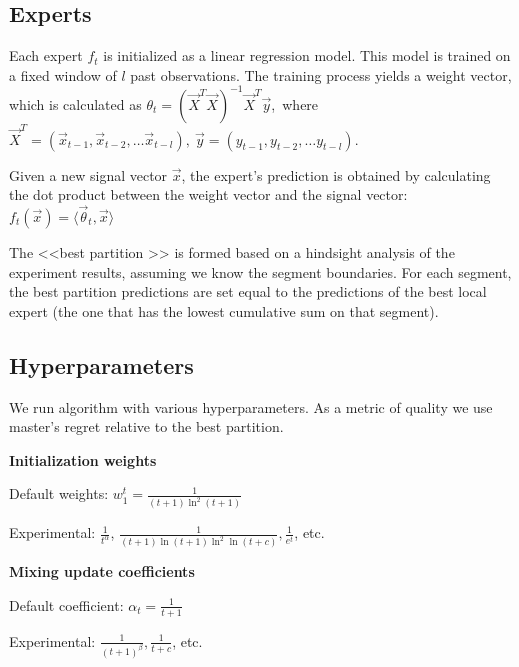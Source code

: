\documentclass[12pt, twoside]{article}
\begin{document}
\subsection{Experts}

Each expert $f_t$ is initialized as a linear regression model. 
This model is trained on a fixed window of $l$ past observations. 
The training process yields a weight vector, which is calculated as  
$\theta_t = (\vec X^T\vec X)^{-1}\vec X^T\vec y$,\ where $\vec X^T = (\vec x_{t-1}, \vec x_{t-2}, \dots \vec x_{t-l}),\ \vec y = (y_{t-1}, y_{t-2}, \dots y_{t-l})$. 

Given a new signal vector  $\vec x$, the expert's prediction is obtained by calculating the dot product between the weight vector and the signal vector: $f_t(\vec x) = \langle \vec \theta_t, \vec x \rangle$ 

The <<best partition >> is formed based on a hindsight analysis of the experiment results, assuming we know the segment boundaries. For each segment, the best partition predictions are set equal to the predictions of the best local expert (the one that has the lowest cumulative sum on that segment).
\newpage

\subsection{Hyperparameters}


We run algorithm with various hyperparameters. As a metric of quality we use master's regret relative to the best partition.

\textbf{Initialization weights}

\hspace*{3mm} Default weights: $w_1^t= \frac{1}{(t+1)\ln^2(t+1)}$

\hspace*{3mm} Experimental: $\frac{1}{t^\alpha}$, $\frac{1}{(t+1)\ln(t+1)\ln^2\ln(t+c)}, \frac{1}{e^t}$, etc.




\textbf{Mixing update coefficients}

\hspace*{3mm} Default coefficient: $\alpha_t = \frac{1}{t+1}$

\hspace*{3mm} Experimental:  $\frac{1}{(t+1)^\beta}, \frac{1}{t+c}$, etc.
\end{document}
